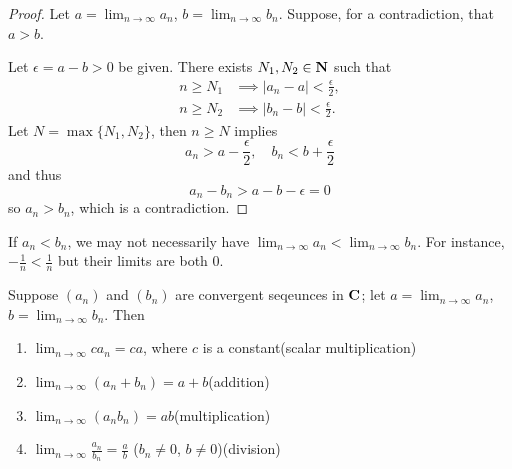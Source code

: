 \begin{proof}
Let $\displaystyle a=\lim_{n\to\infty}a_n$, $\displaystyle b=\lim_{n\to\infty}b_n$. Suppose, for a contradiction, that $a>b$.

Let $\epsilon=a-b>0$ be given. There exists $N_1,N_2\in\mathbf N$ such that
\begin{align*}
n\ge N_1&\implies|a_n-a|<\frac{\epsilon}{2},\\
n\ge N_2&\implies|b_n-b|<\frac{\epsilon}{2}.
\end{align*}
Let $N=\max\{N_1,N_2\}$, then $n\ge N$ implies
\[a_n>a-\frac{\epsilon}{2},\quad b_n<b+\frac{\epsilon}{2}\]
and thus
\[a_n-b_n>a-b-\epsilon=0\]
so $a_n>b_n$, which is a contradiction.
\end{proof}

\begin{remark}
If $a_n<b_n$, we may not necessarily have $\displaystyle\lim_{n\to\infty}a_n<\lim_{n\to\infty}b_n$. For instance, $-\frac{1}{n}<\frac{1}{n}$ but their limits are both $0$.
\end{remark}

\begin{proposition}
Suppose $(a_n)$ and $(b_n)$ are convergent seqeunces in $\mathbf C$; let $\displaystyle a=\lim_{n\to\infty}a_n$, $\displaystyle b=\lim_{n\to\infty}b_n$. Then
\begin{enumerate}[label=(\roman*)]
\item $\displaystyle\lim_{n\to\infty}ca_n=ca$, where $c$ is a constant\hfill(scalar multiplication)
\item $\displaystyle\lim_{n\to\infty}(a_n+b_n)=a+b$\hfill(addition)
\item $\displaystyle\lim_{n\to\infty}(a_n b_n)=ab$\hfill(multiplication)
\item $\displaystyle\lim_{n\to\infty}\frac{a_n}{b_n}=\frac{a}{b}$ ($b_n\neq0$, $b\neq0$)\hfill(division)
\end{enumerate}
\end{proposition}

